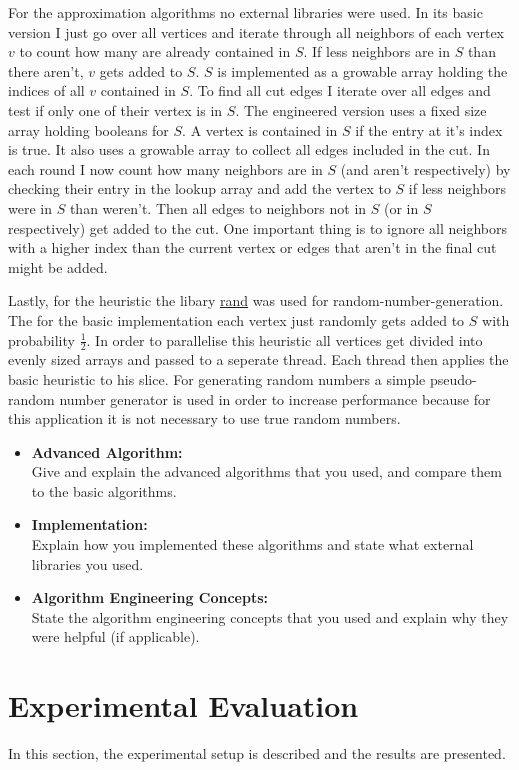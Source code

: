 \documentclass[twocolumn]{article}
\begin{document}
For the approximation algorithms no external libraries were used. 
In its basic version I just go over all vertices and iterate through all neighbors of each vertex $v$ to count how many are already contained in $S$.
If less neighbors are in $S$ than there aren't, $v$ gets added to $S$. $S$ is implemented as a growable array holding the indices of all $v$ contained in $S$.
To find all cut edges I iterate over all edges and test if only one of their vertex is in $S$.
The engineered version uses a fixed size array holding booleans for $S$. A vertex is contained in $S$ if the entry at it's index is true.
It also uses a growable array to collect all edges included in the cut. In each round I now count how many neighbors are in $S$ (and aren't respectively) by checking their entry in
the lookup array and add the vertex to $S$ if less neighbors were in $S$ than weren't. Then all edges to neighbors not in $S$ (or in $S$ respectively) get added to the cut.
One important thing is to ignore all neighbors with a higher index than the current vertex or edges that aren't in the final cut might be added.

Lastly, for the heuristic the libary \href{https://crates.io/crates/rand}{rand} was used for random-number-generation.
The for the basic implementation each vertex just randomly gets added to $S$ with probability $\frac{1}{2}$.
In order to parallelise this heuristic all vertices get divided into evenly sized arrays and passed to a seperate thread.
Each thread then applies the basic heuristic to his slice. For generating random numbers a simple pseudo-random number generator is used
in order to increase performance because for this application it is not necessary to use true random numbers.

\begin{itemize}
	\item \textbf{Advanced Algorithm:}\\
		Give and explain the advanced algorithms that you used, and compare them to the basic algorithms.
	\item \textbf{Implementation:}\\
		Explain how you implemented these algorithms and state what external libraries you used.
	\item \textbf{Algorithm Engineering Concepts:}\\
		State the algorithm engineering concepts that you used and explain why they were helpful (if applicable).
\end{itemize}

\section{Experimental Evaluation}
In this section, the experimental setup is described and the results are presented.
\end{document}
